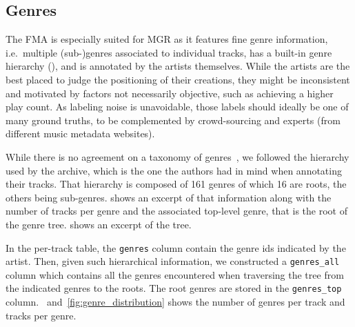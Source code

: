 \documentclass{article}
\newcommand{\ngenres}{161 }
\begin{document}
\subsection{Genres}

The FMA is especially suited for MGR as it features fine genre information, i.e.\ multiple (sub-)genres associated to individual tracks, has a built-in genre hierarchy (), and is annotated by the artists themselves. While the artists are the best placed to judge the positioning of their creations, they might be inconsistent and motivated by factors not necessarily objective, such as achieving a higher play count. As labeling noise is unavoidable, those labels should ideally be one of many ground truths, to be complemented by crowd-sourcing and experts (from different music metadata websites).

While there is no agreement on a taxonomy of genres~\cite{mir_review_genre}, we followed the hierarchy used by the archive, which is the one the authors had in mind when annotating their tracks. That hierarchy is composed of \ngenres genres of which 16 are roots, the others being sub-genres.  shows an excerpt of that information along with the number of tracks per genre and the associated top-level genre, that is the root of the genre tree.  shows an excerpt of the tree.

In the per-track table, the \texttt{genres} column contain the genre ids indicated by the artist. Then, given such hierarchical information, we constructed a \texttt{genres\_all} column which contains all the genres encountered when traversing the tree from the indicated genres to the roots.
The root genres are stored in the \texttt{genres\_top} column.
~and~\ref{fig:genre_distribution} shows the number of genres per track and tracks per genre.

\end{document}
